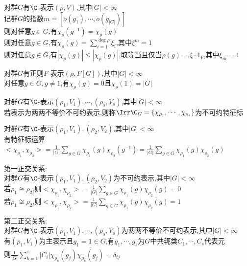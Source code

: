 \begin{dingli}
对群$G$有$\C$-表示$(\rho,V)$,其中$|G|<\infty$\\
记群$G$的指数$m=[o(g_1),\cdots,o(g_{|G|})]$\\
则对任意$g\in G$,有$\chi_{\rho}(g^{-1})=\overline{\chi_{\rho}(g)}$\\
则对任意$g\in G$,有$\chi_{\rho}(g)=\sum\limits_{i=1}^{\deg \rho}\xi_i$,其中$\xi^m=1$\\
则对任意$g\in G$,有$|\chi_{\rho}(g)|\leq |\chi_{\rho}(g)|$,取等当且仅当$\rho(g)=\xi\cdot1_{V}$,其中$\xi_m=1$
\end{dingli}

\begin{dingli}
对群$G$有正则$F$-表示$(\rho,F[G])$,其中$|G|<\infty$\\
对任意$g\in G,g\neq 1$,有$\chi_{\rho}(g)=0$且$\chi_{\rho}(1)=|G|$
\end{dingli}

\begin{dingyi}
对群$G$有$\C$-表示$(\rho_1,V_1),\cdots,(\rho_s,V_s)$,其中$|G|<\infty$\\
若表示为两两不等价不可约表示,则称$\Irr\C_{G}=\{\chi_{\rho_1},\cdots,\chi_{\rho_s}\}$为不可约特征标
\end{dingyi}

\begin{dingyi}
对群$G$有$\C$-表示$(\rho_1,V_1),(\rho_2,V_2)$,其中$|G|<\infty$\\
有特征标运算$<\chi_{\rho_1},\chi_{\rho_2}>=\frac{1}{|G|}\sum\limits_{g\in G}\chi_{\rho_1}(g)\chi_{\rho_2}(g^{-1})=\frac{1}{|G|}\sum\limits_{g\in G}\chi_{\rho_1}(g)\overline{\chi_{\rho_2}(g)}$
\end{dingyi}

\begin{dingli}
第一正交关系:\\
对群$G$有$\C$-表示$(\rho_1,V_1),(\rho_2,V_2)$为不可约表示,其中$|G|<\infty$\\
若$\rho_1\cong\rho_2$,则$<\chi_{\rho_1},\chi_{\rho_2}>=\frac{1}{|G|}\sum\limits_{g\in G}\chi_{\rho_1}(g)\overline{\chi_{\rho_2}(g)}=0$\\
若$\rho_1\not\cong\rho_2$,则$<\chi_{\rho_1},\chi_{\rho_2}>=\frac{1}{|G|}\sum\limits_{g\in G}\chi_{\rho_1}(g)\overline{\chi_{\rho_2}(g)}=1$
\end{dingli}

\begin{dingli}
第二正交关系:\\
对群$G$有$\C$-表示$(\rho_1,V_1),\cdots,(\rho_s,V_s)$为两两不等价不可约表示,其中$|G|<\infty$\\
有$(\rho_1,V_1)$为主表示且$g_1=1\in G$,有$g_1,\cdots,g_s$为$G$中共轭类$C_1,\cdots,C_s$代表元\\
则$\frac{1}{|G|}\sum\limits_{k=1}^{s}|C_i|\chi_{\rho_k}(g_j)\overline{\chi_{\rho_k}(g_j)}=\delta_{ij}$
\end{dingli}

